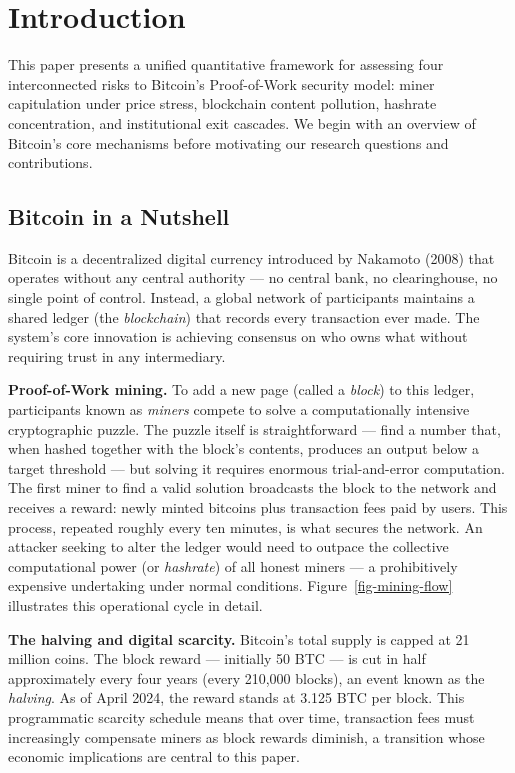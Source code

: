 \documentclass[
  11pt,
]{article}
\let\oldsection\section
\renewcommand{\section}[1]{\FloatBarrier\oldsection{#1}}
\let\oldsubsection\subsection
\renewcommand{\subsection}[1]{\FloatBarrier\oldsubsection{#1}}
\begin{document}
\hypertarget{introduction}{%
\section{Introduction}\label{introduction}}

This paper presents a unified quantitative framework for assessing four
interconnected risks to Bitcoin's Proof-of-Work security model: miner
capitulation under price stress, blockchain content pollution, hashrate
concentration, and institutional exit cascades. We begin with an
overview of Bitcoin's core mechanisms before motivating our research
questions and contributions.

\hypertarget{bitcoin-in-a-nutshell}{%
\subsection{Bitcoin in a Nutshell}\label{bitcoin-in-a-nutshell}}

Bitcoin is a decentralized digital currency introduced by Nakamoto
(2008) that operates without any central authority --- no central bank,
no clearinghouse, no single point of control. Instead, a global network
of participants maintains a shared ledger (the \emph{blockchain}) that
records every transaction ever made. The system's core innovation is
achieving consensus on who owns what without requiring trust in any
intermediary.

\textbf{Proof-of-Work mining.} To add a new page (called a \emph{block})
to this ledger, participants known as \emph{miners} compete to solve a
computationally intensive cryptographic puzzle. The puzzle itself is
straightforward --- find a number that, when hashed together with the
block's contents, produces an output below a target threshold --- but
solving it requires enormous trial-and-error computation. The first
miner to find a valid solution broadcasts the block to the network and
receives a reward: newly minted bitcoins plus transaction fees paid by
users. This process, repeated roughly every ten minutes, is what secures
the network. An attacker seeking to alter the ledger would need to
outpace the collective computational power (or \emph{hashrate}) of all
honest miners --- a prohibitively expensive undertaking under normal
conditions. Figure~\ref{fig-mining-flow} illustrates this operational
cycle in detail.

\textbf{The halving and digital scarcity.} Bitcoin's total supply is
capped at 21 million coins. The block reward --- initially 50 BTC --- is
cut in half approximately every four years (every 210,000 blocks), an
event known as the \emph{halving}. As of April 2024, the reward stands
at 3.125 BTC per block. This programmatic scarcity schedule means that
over time, transaction fees must increasingly compensate miners as block
rewards diminish, a transition whose economic implications are central
to this paper.
\end{document}
